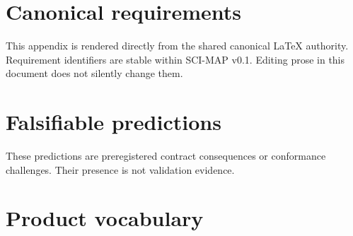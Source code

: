 \documentclass[10pt]{article}
\begin{document}
\clearpage
\section{Canonical requirements}\label{app:requirements}

This appendix is rendered directly from the shared canonical LaTeX authority.
Requirement identifiers are stable within SCI-MAP v0.1. Editing prose in this
document does not silently change them.

\renewcommand{\SCIMapRequirement}[4]{%
  \phantomsection\label{req:#1}%
  \noindent\textbf{\textcolor{MapNavy}{#1} -- #2.} #3\par\smallskip}
\begin{sloppypar}
\SCIMapRequirements
\end{sloppypar}

\clearpage
\section{Falsifiable predictions}\label{app:predictions}

These predictions are preregistered contract consequences or conformance
challenges. Their presence is not validation evidence.

\renewcommand{\SCIMapPrediction}[4]{%
  \phantomsection\label{pred:#1}%
  \noindent\textbf{\textcolor{MapNavy}{#1} -- #2.} #3
  \textit{Primary claim layer: #4.}\par\smallskip}
\SCIMapPredictions

\clearpage
\section{Product vocabulary}
\end{document}
